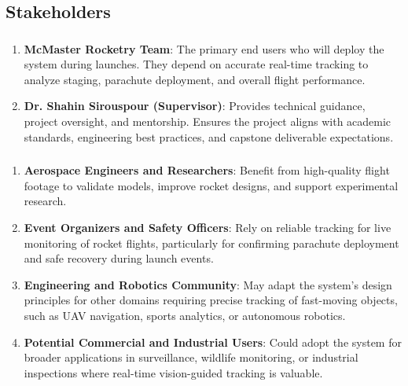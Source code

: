 \documentclass{article}
\begin{document}
\subsection{Stakeholders}

\subsubsection*{\color{blue}{Direct Stakeholders}}
\begin{enumerate}
  \item \textbf{McMaster Rocketry Team}: The primary end users who
        will deploy the system during launches. They depend on accurate
        real-time tracking to analyze staging, parachute deployment, and
        overall flight performance.

  \item \textbf{Dr. Shahin Sirouspour (Supervisor)}: Provides
        technical guidance, project oversight, and mentorship. Ensures
        the project aligns with academic standards, engineering best
        practices, and capstone deliverable expectations.
\end{enumerate}

\subsubsection*{\color{blue}{Indirect Stakeholders}}
\begin{enumerate}
  \item \textbf{Aerospace Engineers and Researchers}: Benefit from
        high-quality flight footage to validate models, improve rocket
        designs, and support experimental research.

  \item \textbf{Event Organizers and Safety Officers}: Rely on
        reliable tracking for live monitoring of rocket flights,
        particularly for confirming parachute deployment and safe
        recovery during launch events.

  \item \textbf{Engineering and Robotics Community}: May adapt the
        system’s design principles for other domains requiring precise
        tracking of fast-moving objects, such as UAV navigation, sports
        analytics, or autonomous robotics.

  \item \textbf{Potential Commercial and Industrial Users}: Could
        adopt the system for broader applications in surveillance,
        wildlife monitoring, or industrial inspections where real-time
        vision-guided tracking is valuable.
\end{enumerate}
\end{document}
